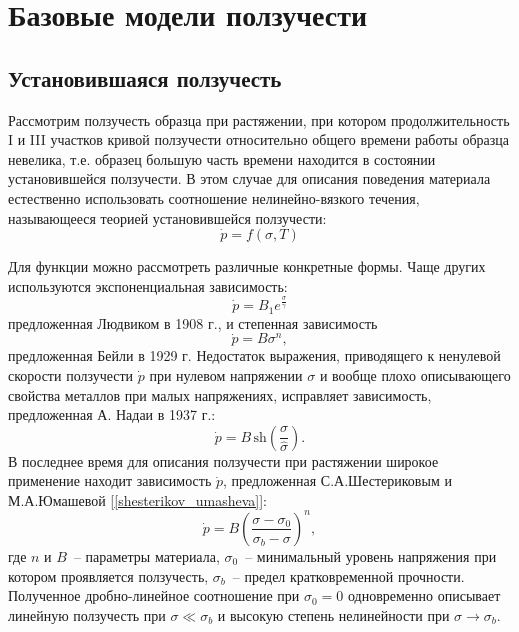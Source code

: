 \section{Базовые модели ползучести}

\subsection{Установившаяся ползучесть}
Рассмотрим ползучесть образца при растяжении, при котором продолжительность I и III участков кривой ползучести относительно общего времени работы образца невелика, т.е. образец большую часть времени находится в состоянии установившейся ползучести. 
В этом случае для описания поведения материала естественно использовать соотношение нелинейно-вязкого течения, называющееся теорией установившейся ползучести:
 \begin{equation}
 	\dot{p} = f(\sigma, T)
 \end{equation}
 
Для функции  можно рассмотреть различные конкретные формы. Чаще других используются экспоненциальная зависимость:
\begin{equation} 
	\dot{p} = B_1e^{\frac{\sigma}{\gamma}}
\end{equation}
предложенная Людвиком в 1908 г., и степенная зависимость
\begin{equation} 
	\dot{p} = B\sigma^n,
\end{equation}
предложенная Бейли в 1929 г. Недостаток выражения, приводящего к ненулевой скорости ползучести $\dot{p}$ при нулевом напряжении $\sigma$ и вообще плохо описывающего свойства металлов при малых напряжениях, исправляет зависимость, предложенная А. Надаи в 1937 г.:
\begin{equation}
	\dot{p} = B\, \text{sh}(\dfrac{\sigma}{\widehat{\sigma}}).
\end{equation}
В последнее время для описания ползучести при растяжении широкое применение находит зависимость $\dot{p}$, предложенная С.А.Шестериковым и М.А.Юмашевой [\ref{shesterikov_umasheva}]:
\begin{equation}
	\dot{p} = B\left(\dfrac{\sigma-\sigma_0}{\sigma_b-\sigma}\right)^n,
\end{equation}
где $n$ и $B$~-- параметры материала, $\sigma_0$~-- минимальный уровень напряжения при котором проявляется ползучесть, $\sigma_b$~-- предел кратковременной прочности.
Полученное дробно-линейное соотношение при $\sigma_0 = 0$ одновременно описывает линейную ползучесть при $\sigma \ll \sigma_b$ и высокую степень нелинейности при $\sigma \to \sigma_b$.
